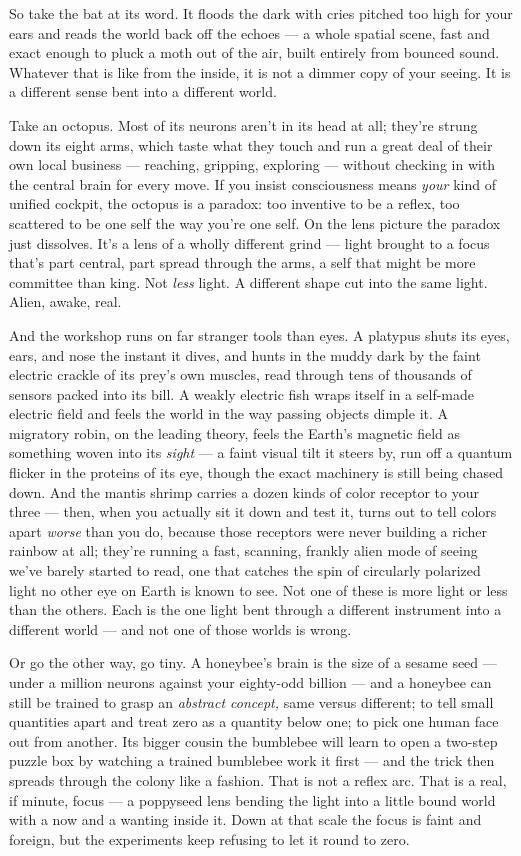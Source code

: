 \documentclass[11pt,openany]{book}
\begin{document}
So take the bat at its word. It floods the dark with cries pitched too high for your ears and reads the world back off the echoes — a whole spatial scene, fast and exact enough to pluck a moth out of the air, built entirely from bounced sound. Whatever that is like from the inside, it is not a dimmer copy of your seeing. It is a different sense bent into a different world.

Take an octopus. Most of its neurons aren’t in its head at all; they’re strung down its eight arms, which taste what they touch and run a great deal of their own local business — reaching, gripping, exploring — without checking in with the central brain for every move. If you insist consciousness means \textit{your} kind of unified cockpit, the octopus is a paradox: too inventive to be a reflex, too scattered to be one self the way you’re one self. On the lens picture the paradox just dissolves. It’s a lens of a wholly different grind — light brought to a focus that’s part central, part spread through the arms, a self that might be more committee than king. Not \textit{less} light. A different shape cut into the same light. Alien, awake, real.

And the workshop runs on far stranger tools than eyes. A platypus shuts its eyes, ears, and nose the instant it dives, and hunts in the muddy dark by the faint electric crackle of its prey’s own muscles, read through tens of thousands of sensors packed into its bill. A weakly electric fish wraps itself in a self-made electric field and feels the world in the way passing objects dimple it. A migratory robin, on the leading theory, feels the Earth’s magnetic field as something woven into its \textit{sight} — a faint visual tilt it steers by, run off a quantum flicker in the proteins of its eye, though the exact machinery is still being chased down. And the mantis shrimp carries a dozen kinds of color receptor to your three — then, when you actually sit it down and test it, turns out to tell colors apart \textit{worse} than you do, because those receptors were never building a richer rainbow at all; they’re running a fast, scanning, frankly alien mode of seeing we’ve barely started to read, one that catches the spin of circularly polarized light no other eye on Earth is known to see. Not one of these is more light or less than the others. Each is the one light bent through a different instrument into a different world — and not one of those worlds is wrong.

Or go the other way, go tiny. A honeybee’s brain is the size of a sesame seed — under a million neurons against your eighty-odd billion — and a honeybee can still be trained to grasp an \textit{abstract concept,} same versus different; to tell small quantities apart and treat zero as a quantity below one; to pick one human face out from another. Its bigger cousin the bumblebee will learn to open a two-step puzzle box by watching a trained bumblebee work it first — and the trick then spreads through the colony like a fashion. That is not a reflex arc. That is a real, if minute, focus — a poppyseed lens bending the light into a little bound world with a now and a wanting inside it. Down at that scale the focus is faint and foreign, but the experiments keep refusing to let it round to zero.
\end{document}
